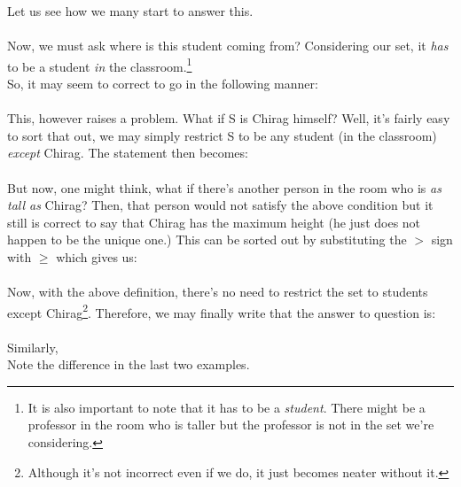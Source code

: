 \hrulefill
{}
Let us see how we many start to answer this.\\
{\color{examplecolor}{First, we must pick a student to compare heights.}}\\
Now, we must ask where is this student coming from? Considering our set, it \textit{has} to be a student \textit{in} the classroom.\footnote{It is also important to note that it has to be a \textit{student}. There might be a professor in the room who is taller but the professor is not in the set we're considering.}\\
So, it may seem to correct to go in the following manner:\\
{\color{examplecolor}{Let S be any student in the classroom.
Then, height of Chirag $>$ height of S.}} \\
This, however raises a problem. What if S is Chirag himself? Well, it's fairly easy to sort that out, we may simply restrict S to be any student (in the classroom) \textit{except} Chirag. The statement then becomes:\\
{\color{examplecolor}{Let S be any student in the classroom except Chirag. Then, height of Chirag $>$ height of S.}} \\
But now, one might think, what if there's another person in the room who is \textit{as tall as} Chirag? Then, that person would not satisfy the above condition but it still is correct to say that Chirag has the maximum height (he just does not happen to be the unique one.) This can be sorted out by substituting the $>$ sign with $\ge$ which gives us: \\
{\color{examplecolor}{Let S be any student in the classroom except Chirag. Then, height of Chirag $\ge$ height of S.}} \\
Now, with the above definition, there's no need to restrict the set to students except Chirag\footnote{Although it's not incorrect even if we do, it just becomes neater without it.}. Therefore, we may finally write that the answer to question is:\\
{\color{examplecolor}{Let S be any student in the classroom. Then, height of Chirag $\ge$ height of S.}} \\
Similarly,
\\
Note the difference in the last two examples.

